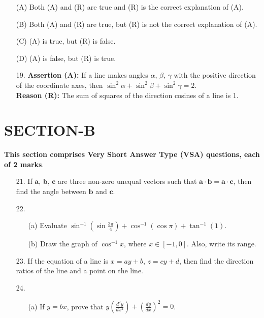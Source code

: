 \documentclass{article}
\begin{document}
\begin{enumerate}
\begin{enumerate}
\item[(A)] Both (A) and (R) are true and (R) is the correct explanation of (A).
\item[(B)] Both (A) and (R) are true, but (R) is not the correct explanation of (A).
\item[(C)] (A) is true, but (R) is false.
\item[(D)] (A) is false, but (R) is true.
\end{enumerate}

\begin{enumerate}
\item[19.] \textbf{Assertion (A):} If a line makes angles $\alpha$, $\beta$, $\gamma$ with the positive direction of the coordinate axes, then $\sin^2 \alpha + \sin^2 \beta + \sin^2 \gamma = 2$. \\
\textbf{Reason (R):} The sum of squares of the direction cosines of a line is 1.
\end{enumerate}
\section*{SECTION-B}

\textbf{This section comprises Very Short Answer Type (VSA) questions, each of 2 marks}.

\begin{enumerate}
\item[21.] If $\mathbf{a}$, $\mathbf{b}$, $\mathbf{c}$ are three non-zero unequal vectors such that $\mathbf{a} \cdot \mathbf{b} = \mathbf{a} \cdot \mathbf{c}$, then find the angle between $\mathbf{b}$ and $\mathbf{c}$.

\item[22.]
\begin{enumerate}
\item[(a)] Evaluate $\sin^{-1}(\sin\frac{3\pi}{4}) + \cos^{-1}(\cos \pi) + \tan^{-1}(1)$.

\item[(b)] Draw the graph of $\cos^{-1} x$, where $x \in [-1, 0]$. Also, write its range.
\end{enumerate}

\item[23.] If the equation of a line is $x = ay + b$, $z = cy + d$, then find the direction ratios of the line and a point on the line.

\item[24.]
\begin{enumerate}
\item[(a)] If $y = bx$, prove that $y \left(\frac{d^2y}{dx^2}\right) + \left(\frac{dy}{dx}\right)^2 = 0$.


\end{enumerate}
\end{enumerate}
\end{enumerate}
\end{document}
